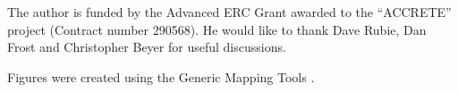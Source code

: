 \begin{acknowledgements}
The author is funded by the Advanced ERC Grant awarded to the ``ACCRETE'' project (Contract number 290568). He would like to thank Dave Rubie, Dan Frost and Christopher Beyer for useful discussions.

Figures were created using the Generic Mapping Tools \citep{GMT}.
\end{acknowledgements}







\grid
